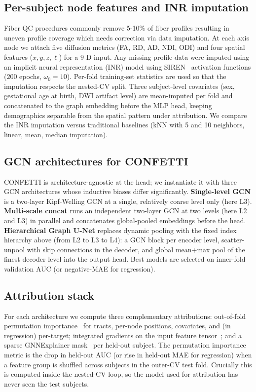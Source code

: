 \documentclass[runningheads]{llncs}
\begin{document}
\subsection{Per-subject node features and INR imputation}

Fiber QC procedures commonly remove 5-10\% of fiber profiles resulting in uneven 
profile coverage which needs correction via data imputation. 
At each axis node we attach five diffusion metrics (FA, RD, AD, NDI, ODI)
and four spatial features ($x,y,z,\ell$) for a $9$-D input. 
Any missing profile data were imputed using an implicit neural representation (INR) model using
SIREN~\cite{ref_sitzmann} activation functions ($200$ epochs, $\omega_0\!=\!10$). Per-fold
training-set statistics are used so that the imputation
respects the nested-CV split. Three subject-level covariates (sex,
gestational age at birth, DWI artifact level) are mean-imputed per
fold and concatenated to the graph embedding before the MLP head, keeping
demographics separable from the spatial pattern under attribution. We compare the INR imputation versus traditional baselines (kNN with 5 and 10 neighbors, linear, mean, median imputation).

\subsection{GCN architectures for CONFETTI}

CONFETTI is architecture-agnostic at the head; we instantiate it with three
GCN architectures whose inductive biases differ significantly.
\textbf{Single-level GCN} is a two-layer Kipf-Welling GCN at a single, relatively coarse
 level only (here L3).
\textbf{Multi-scale concat} runs an independent two-layer GCN at two levels (here L2 and L3)
in parallel and concatenates global-pooled embeddings before the head.
\textbf{Hierarchical Graph U-Net} replaces dynamic pooling with the fixed
index hierarchy above (from L2 to L3 to L4): a GCN block per encoder level, scatter-unpool with
skip connections in the decoder, and global mean+max pool of the finest
decoder level into the output head. Best models are selected on inner-fold
validation AUC (or negative-MAE for regression).

\subsection{Attribution stack}

For each architecture we compute three complementary attributions:
out-of-fold permutation importance~\cite{ref_breiman} for tracts, per-node
positions, covariates, and (in regression) per-target; integrated gradients
on the input feature tensor~\cite{ref_sundararajan}; and a sparse
GNNExplainer mask~\cite{ref_ying} per held-out subject. The permutation
importance metric is the drop in held-out AUC (or rise in held-out MAE for
regression) when a feature group is shuffled across subjects in the
outer-CV test fold. Crucially this is computed inside the nested-CV loop,
so the model used for attribution has never seen the test subjects.
\end{document}
